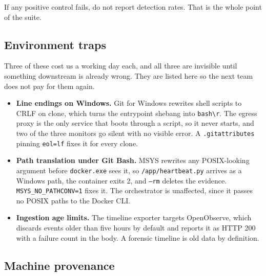 If any positive control fails, do not report detection rates. That is the
whole point of the suite.

\subsection{Environment traps}

Three of these cost us a working day each, and all three are invisible until
something downstream is already wrong. They are listed here so the next team
does not pay for them again.

\begin{itemize}
\item \textbf{Line endings on Windows.} Git for Windows rewrites shell scripts
      to CRLF on clone, which turns the entrypoint shebang into
      \texttt{bash\textbackslash r}. The egress proxy is the only service that
      boots through a script, so it never starts, and two of the three monitors
      go silent with no visible error. A \texttt{.gitattributes} pinning
      \texttt{eol=lf} fixes it for every clone.
\item \textbf{Path translation under Git Bash.} MSYS rewrites any
      POSIX-looking argument before \texttt{docker.exe} sees it, so
      \texttt{/app/heartbeat.py} arrives as a Windows path, the container exits
      2, and \texttt{--rm} deletes the evidence. \texttt{MSYS\_NO\_PATHCONV=1}
      fixes it. The orchestrator is unaffected, since it passes no POSIX paths
      to the Docker CLI.
\item \textbf{Ingestion age limits.} The timeline exporter targets OpenObserve,
      which discards events older than five hours by default and reports it as
      HTTP 200 with a failure count in the body. A forensic timeline is old
      data by definition.
\end{itemize}

\subsection{Machine provenance}

